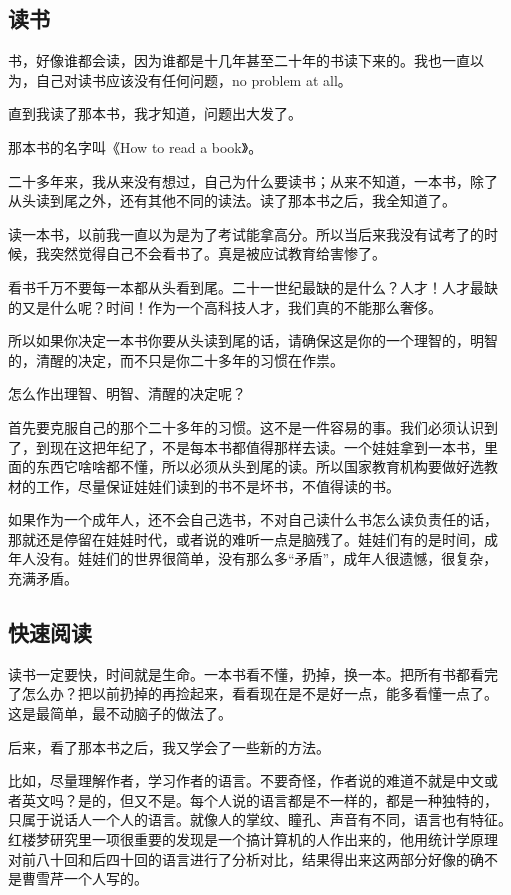 \documentclass[10pt]{article}
\begin{document}
\begin{CJK*}{UTF8}{simhei}
\subsection{读书}

书，好像谁都会读，因为谁都是十几年甚至二十年的书读下来的。我也一直以
为，自己对读书应该没有任何问题，no problem at all。

直到我读了那本书，我才知道，问题出大发了。

那本书的名字叫《How to read a book》。

二十多年来，我从来没有想过，自己为什么要读书；从来不知道，一本书，除了
从头读到尾之外，还有其他不同的读法。读了那本书之后，我全知道了。

读一本书，以前我一直以为是为了考试能拿高分。所以当后来我没有试考了的时
候，我突然觉得自己不会看书了。真是被应试教育给害惨了。

看书千万不要每一本都从头看到尾。二十一世纪最缺的是什么？人才！人才最缺
的又是什么呢？时间！作为一个高科技人才，我们真的不能那么奢侈。

所以如果你决定一本书你要从头读到尾的话，请确保这是你的一个理智的，明智
的，清醒的决定，而不只是你二十多年的习惯在作祟。

怎么作出理智、明智、清醒的决定呢？

首先要克服自己的那个二十多年的习惯。这不是一件容易的事。我们必须认识到
了，到现在这把年纪了，不是每本书都值得那样去读。一个娃娃拿到一本书，里
面的东西它啥啥都不懂，所以必须从头到尾的读。所以国家教育机构要做好选教
材的工作，尽量保证娃娃们读到的书不是坏书，不值得读的书。

如果作为一个成年人，还不会自己选书，不对自己读什么书怎么读负责任的话，
那就还是停留在娃娃时代，或者说的难听一点是脑残了。娃娃们有的是时间，成
年人没有。娃娃们的世界很简单，没有那么多“矛盾”，成年人很遗憾，很复杂，
充满矛盾。

\subsection{快速阅读}

读书一定要快，时间就是生命。一本书看不懂，扔掉，换一本。把所有书都看完
了怎么办？把以前扔掉的再捡起来，看看现在是不是好一点，能多看懂一点了。
这是最简单，最不动脑子的做法了。

后来，看了那本书之后，我又学会了一些新的方法。

比如，尽量理解作者，学习作者的语言。不要奇怪，作者说的难道不就是中文或
者英文吗？是的，但又不是。每个人说的语言都是不一样的，都是一种独特的，
只属于说话人一个人的语言。就像人的掌纹、瞳孔、声音有不同，语言也有特征。
红楼梦研究里一项很重要的发现是一个搞计算机的人作出来的，他用统计学原理
对前八十回和后四十回的语言进行了分析对比，结果得出来这两部分好像的确不
是曹雪芹一个人写的。


\end{CJK*}
\end{document}
